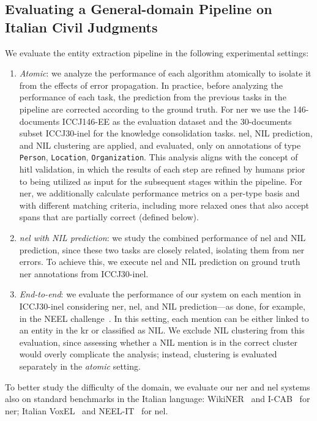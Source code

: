 \subsection{Evaluating a General-domain Pipeline on Italian Civil Judgments}
\label{sec:judgment_ee_eval}

We evaluate the entity extraction pipeline in the following experimental settings:
\begin{enumerate}
    \item \textit{Atomic}: we analyze the performance of each algorithm atomically to isolate it from the effects of error propagation. In practice, before analyzing the performance of each task, the prediction from the previous tasks in the pipeline are corrected according to the ground truth. For \ac{ner} we use the 146-documents ICCJ146-EE as the evaluation dataset and the 30-documents subset ICCJ30-\ac{inel} for the knowledge consolidation tasks. \ac{nel}, NIL prediction, and NIL clustering are applied, and evaluated, only on annotations of type \texttt{Person}, \texttt{Location}, \texttt{Organization}. This analysis aligns with the concept of \acf{hitl} validation, in which the results of each step are refined by humans prior to being utilized as input for the subsequent stages within the pipeline. For \ac{ner}, we additionally calculate performance metrics on a per-type basis and with different matching criteria, including more relaxed ones that also accept spans that are partially correct (defined below).  
    \item \textit{\ac{nel} with NIL prediction}: we study the combined performance of \ac{nel} and NIL prediction, since these two tasks are closely related, isolating them from \ac{ner} errors. To achieve this, we execute \ac{nel} and NIL prediction on ground truth \ac{ner} annotations from ICCJ30-\ac{inel}.
    \item \textit{End-to-end}: we evaluate the performance of our system on each mention in ICCJ30-\ac{inel} considering \ac{ner}, \ac{nel}, and NIL prediction---as done, for example, in the NEEL challenge~\cite{basile2016neelit}. In this setting, each mention can be either linked to an entity in the \ac{kr} or classified as NIL. We exclude NIL clustering from this evaluation, since assessing whether a NIL mention is in the correct cluster would overly complicate the analysis; instead, clustering is evaluated separately in the \textit{atomic} setting.


\end{enumerate}
To better study the difficulty of the domain, we evaluate our \ac{ner} and \ac{nel} systems also on standard benchmarks in the Italian language: WikiNER~\cite{NOTHMAN2013151} and I-CAB~\cite{magnini-etal-2006-cab} for \ac{ner}; Italian VoxEL~\cite{rosales2018voxel} and NEEL-IT~\cite{basile2016neelit} for \ac{nel}.

